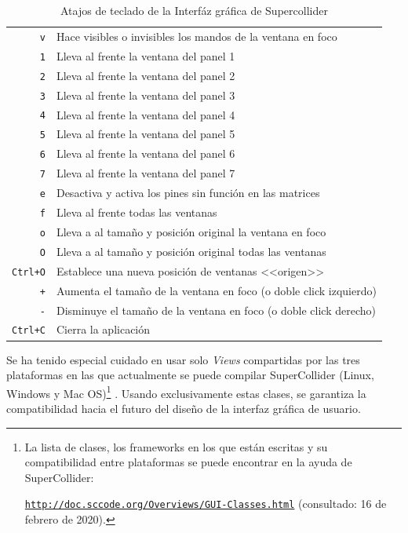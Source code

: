 \begin{table}
	\begin{center}
		\begin{tabular}{ |r|l| }
  		\hline
  		\texttt{v} & Hace visibles o invisibles los mandos de la ventana en foco\\
  		\texttt{1} & Lleva al frente la ventana del panel 1\\
  		\texttt{2} & Lleva al frente la ventana del panel 2\\
  		\texttt{3} & Lleva al frente la ventana del panel 3\\
  		\texttt{4} & Lleva al frente la ventana del panel 4\\
  		\texttt{5} & Lleva al frente la ventana del panel 5\\
  		\texttt{6} & Lleva al frente la ventana del panel 6\\
  		\texttt{7} & Lleva al frente la ventana del panel 7\\
  		\texttt{e} & Desactiva y activa los pines sin función en las matrices\\
  		\texttt{f} & Lleva al frente todas las ventanas\\
  		\texttt{o} & Lleva a al tamaño y posición original la ventana en foco\\
  		\texttt{O} & Lleva a al tamaño y posición original todas las ventanas\\
  		\texttt{Ctrl+O} & Establece una nueva posición de ventanas <<origen>>\\
  		\texttt{+} & Aumenta el tamaño de la ventana en foco (o doble click izquierdo)\\
  		\texttt{-} & Disminuye el tamaño de la ventana en foco (o doble click derecho)\\
  		\texttt{Ctrl+C} & Cierra la aplicación\\
  		
  		\hline
		\end{tabular}
		\caption[Atajos de teclado]{Atajos de teclado de la Interfáz gráfica de Supercollider}
		\label{table:atajos}
	\end{center}
\end{table}

Se ha tenido especial cuidado en usar solo \textit{Views} compartidas por las tres plataformas en las que actualmente se puede compilar SuperCollider (Linux, Windows y Mac OS)\footnote{La lista de clases, los frameworks en los que están escritas y su compatibilidad entre plataformas se puede encontrar en la ayuda de SuperCollider: 

\href{http://doc.sccode.org/Overviews/GUI-Classes.html}{\texttt{http://doc.sccode.org/Overviews/GUI-Classes.html}} (consultado: 16 de febrero de 2020). } . Usando exclusivamente estas clases, se garantiza la compatibilidad hacia el futuro del diseño de la interfaz gráfica de usuario.

